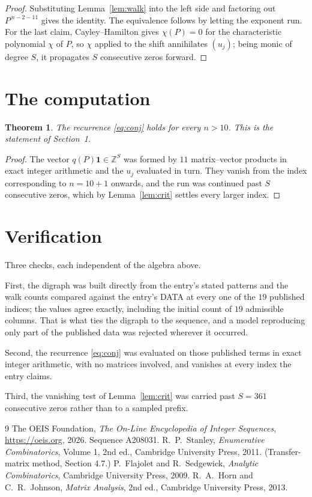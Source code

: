 \documentclass[11pt,a4paper]{article}
\theoremstyle{plain}
\newtheorem{theorem}{Theorem}
\theoremstyle{definition}
\begin{document}
\begin{proof}
Substituting Lemma~\ref{lem:walk} into the left side and factoring out
$P^{\,n-2-11}$ gives the identity. The equivalence follows by letting the exponent
run. For the last claim, Cayley--Hamilton gives $\chi(P)=0$ for the characteristic
polynomial $\chi$ of $P$, so $\chi$ applied to the shift annihilates $(u_j)$; being monic of
degree $S$, it propagates $S$ consecutive zeros forward.
\end{proof}

\section{The computation}

\begin{theorem}
The recurrence \eqref{eq:conj} holds for every $n>10$. This is the statement of
Section~1.
\end{theorem}

\begin{proof}
The vector $q(P)\mathbf{1}\in\mathbb{Z}^{S}$ was formed by $11$ matrix--vector
products in exact integer arithmetic and the $u_j$ evaluated in turn. They vanish from the
index corresponding to $n=10+1$ onwards, and the run was continued past $S$ consecutive
zeros, which by Lemma~\ref{lem:crit} settles every larger index.
\end{proof}

\section{Verification}

Three checks, each independent of the algebra above.

First, the digraph was built directly from the entry's stated patterns and the walk counts
compared against the entry's DATA at every one of the $19$ published indices; the
values agree exactly, including the initial count of $19$ admissible columns. That is
what ties the digraph to the sequence, and a model reproducing only part of the published
data was rejected wherever it occurred.

Second, the recurrence \eqref{eq:conj} was evaluated on those published terms in exact
integer arithmetic, with no matrices involved, and vanishes at every index the entry claims.

Third, the vanishing test of Lemma~\ref{lem:crit} was carried past $S=361$ consecutive
zeros rather than to a sampled prefix.

\begin{thebibliography}{9}
 The OEIS Foundation, \emph{The On-Line Encyclopedia of Integer
Sequences}, \url{https://oeis.org}, 2026. Sequence A208031.
 R.~P.~Stanley, \emph{Enumerative Combinatorics}, Volume 1, 2nd ed.,
Cambridge University Press, 2011. (Transfer-matrix method, Section 4.7.)
 P.~Flajolet and R.~Sedgewick, \emph{Analytic Combinatorics}, Cambridge
University Press, 2009.
 R.~A.~Horn and C.~R.~Johnson, \emph{Matrix Analysis}, 2nd ed., Cambridge
University Press, 2013.
\end{thebibliography}
\end{document}
